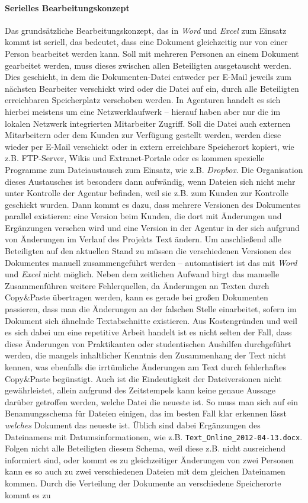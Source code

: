\label{p:serielles-konzept}\paragraph{Serielles Bearbeitungskonzept} Das grundsätzliche Bearbeitungskonzept, das in \emph{Word} und \emph{Excel} zum Einsatz kommt ist seriell, das bedeutet, dass eine Dokument gleichzeitig nur von einer Person bearbeitet werden kann. Soll mit mehreren Personen an einem Dokument gearbeitet werden, muss dieses zwischen allen Beteiligten ausgetauscht werden. Dies geschieht, in dem die Dokumenten-Datei entweder per E-Mail jeweils zum nächsten Bearbeiter verschickt wird oder die Datei auf ein, durch alle Beteiligten erreichbaren Speicherplatz verschoben werden. In Agenturen handelt es sich hierbei meistens um eine Netzwerklaufwerk -- hierauf haben aber nur die im lokalen Netzwerk integrierten Mitarbeiter Zugriff. Soll die Datei auch externen Mitarbeitern oder dem Kunden zur Verfügung gestellt werden, werden diese wieder per E-Mail verschickt oder in extern erreichbare Speicherort kopiert, wie z.B. FTP-Server, Wikis und Extranet-Portale oder es kommen spezielle Programme zum Dateiaustausch zum Einsatz, wie z.B. \emph{Dropbox}. Die Organisation dieses Austausches ist besonders dann aufwändig, wenn Dateien sich nicht mehr unter Kontrolle der Agentur befinden, weil sie z.B. zum Kunden zur Kontrolle geschickt wurden. Dann kommt es dazu, dass mehrere Versionen des Dokumentes parallel existieren: eine Version beim Kunden, die dort mit Änderungen und Ergänzungen versehen wird und eine Version in der Agentur in der sich aufgrund von Änderungen im Verlauf des Projekts Text ändern. Um anschließend alle Beteiligten auf den aktuellen Stand zu müssen die verschiedenen Versionen des Dokumentes manuell zusammengeführt werden -- automatisiert ist das mit \emph{Word} und \emph{Excel} nicht möglich. Neben dem zeitlichen Aufwand birgt das manuelle Zusammenführen weitere Fehlerquellen, da Änderungen an Texten durch Copy\&Paste übertragen werden, kann es gerade bei großen Dokumenten passieren, dass man die Änderungen an der falschen Stelle einarbeitet, sofern im Dokument sich ähnelnde Textabschnitte existieren. Aus Kostengründen und weil es sich dabei um eine repetitive Arbeit handelt ist es nicht selten der Fall, dass diese Änderungen von Praktikanten oder studentischen Aushilfen durchgeführt werden, die mangels inhaltlicher Kenntnis den Zusammenhang der Text nicht kennen, was ebenfalls die irrtümliche Änderungen am Text durch fehlerhaftes Copy\&Paste begünstigt. Auch ist die Eindeutigkeit der Dateiversionen nicht gewährleistet, allein aufgrund des Zeitstempels kann keine genaue Aussage darüber getroffen werden, welche Datei die neueste ist. So muss man sich auf ein Benamungsschema für Dateien einigen, das im besten Fall klar erkennen lässt \emph{welches} Dokument das neueste ist. Üblich sind dabei Ergänzungen des Dateinamens mit Datumsinformationen, wie z.B. \texttt{Text\_Online\_2012-04-13.docx}. Folgen nicht alle Beteiligten diesem Schema, weil diese z.B. nicht ausreichend informiert sind, oder kommt es zu gleichzeitiger Änderungen von zwei Personen kann es so auch zu zwei verschiedenen Dateien mit dem gleichen Dateinamen kommen. Durch die Verteilung der Dokumente an verschiedene Speicherorte kommt es zu 